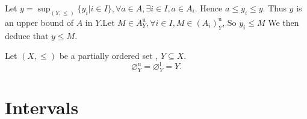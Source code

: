 \begin{proofenv}
    Let $y=\sup_{(Y, \le)}\{y_i|i\in I\}, \forall a\in A , \exists i\in I, a\in A_i$. Hence $a\le y_i\le y$. Thus $y $ is an upper bound of $A$ in $Y$.Let $M\in A_Y^\mathrm{u}, \forall i \in I, M\in (A_i)_Y^\mathrm{u}$,  So $y_i \le M $ We then deduce that $y\le M$.
\end{proofenv}
\begin{propositionenv}
    Let $(X, \le)$ be a partially ordered set , $Y\subseteq X$.$$\varnothing_Y^\mathrm{u}=\varnothing_Y^\mathrm{l}=Y.$$
\end{propositionenv}


\section{Intervals}

